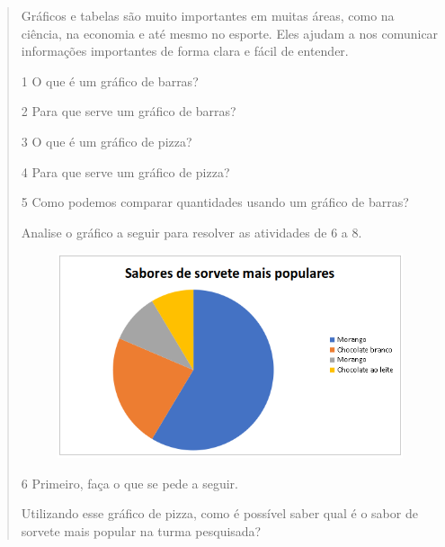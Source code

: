 \begin{quote}
{Gráficos e tabelas são muito importantes em muitas áreas, como na
ciência, na economia e até mesmo no esporte. Eles ajudam a nos comunicar
informações importantes de forma clara e fácil de entender.}

\pagebreak


\num{1} O que é um gráfico de barras?



\num{2} Para que serve um gráfico de barras?



\num{3} O que é um gráfico de pizza?


\num{4} Para que serve um gráfico de pizza?



\num{5} Como podemos comparar quantidades usando um gráfico de barras?



Analise o gráfico a seguir para resolver as atividades de 6 a 8.

\begin{figure}[htpb!]
\includegraphics[width=.5\textwidth]{./imgs/chart3.png}
\end{figure}

\num{6} Primeiro, faça o que se pede a seguir.

\begin{escolha}
\item Utilizando esse gráfico de pizza, como é possível saber qual é o sabor de sorvete mais popular na turma pesquisada?


\end{escolha}
\end{quote}

